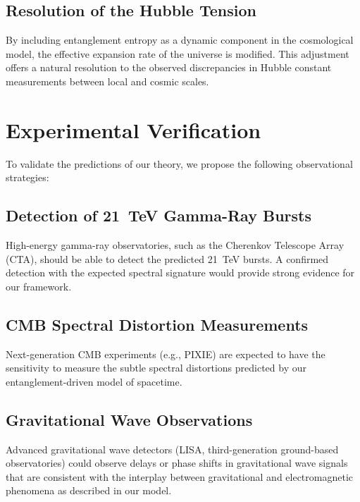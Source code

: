 \documentclass[12pt, a4paper]{article}
\begin{document}
\subsection{Resolution of the Hubble Tension}
By including entanglement entropy as a dynamic component in the cosmological model, the effective expansion rate of the universe is modified. This adjustment offers a natural resolution to the observed discrepancies in Hubble constant measurements between local and cosmic scales.

\section{Experimental Verification}
To validate the predictions of our theory, we propose the following observational strategies:

\subsection{Detection of 21~TeV Gamma-Ray Bursts}
High-energy gamma-ray observatories, such as the Cherenkov Telescope Array (CTA), should be able to detect the predicted 21~TeV bursts. A confirmed detection with the expected spectral signature would provide strong evidence for our framework.

\subsection{CMB Spectral Distortion Measurements}
Next-generation CMB experiments (e.g., PIXIE) are expected to have the sensitivity to measure the subtle spectral distortions predicted by our entanglement-driven model of spacetime.

\subsection{Gravitational Wave Observations}
Advanced gravitational wave detectors (LISA, third-generation ground-based observatories) could observe delays or phase shifts in gravitational wave signals that are consistent with the interplay between gravitational and electromagnetic phenomena as described in our model.

\end{document}
